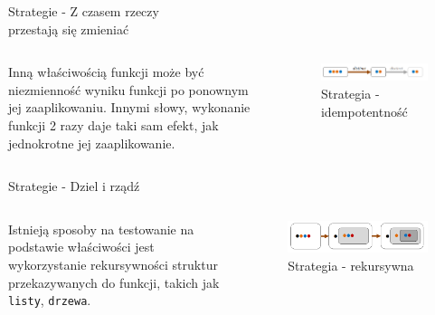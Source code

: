 \begin{frame}{Strategie - Z czasem rzeczy\\przestają się zmieniać}
    \begin{columns}[t]
            Inną właściwością funkcji może być niezmienność wyniku funkcji po ponownym jej zaaplikowaniu. 
            Innymi słowy, wykonanie funkcji 2 razy daje taki sam efekt, jak jednokrotne jej zaaplikowanie.
        \centering
        \begin{figure}
            \centering
            \includegraphics[width=1\textwidth]{images/property_idempotence.png}
            \caption{Strategia - idempotentność}
            \label{fig:independance_strategy}
        \end{figure}    
    \end{columns}
\end{frame}

\begin{frame}[fragile]{Strategie - Dziel i rządź}
    \begin{columns}[t]
            Istnieją sposoby na testowanie na podstawie właściwości jest wykorzystanie rekursywności struktur przekazywanych do funkcji, takich jak \texttt{listy}, \texttt{drzewa}. 
            \centering
            \begin{figure}
                \centering
                \includegraphics[width=1\textwidth]{images/property_induction.png}
                \caption{Strategia - rekursywna}
                \label{fig:recursive_strategy}
            \end{figure}    
    \end{columns}
\end{frame}

